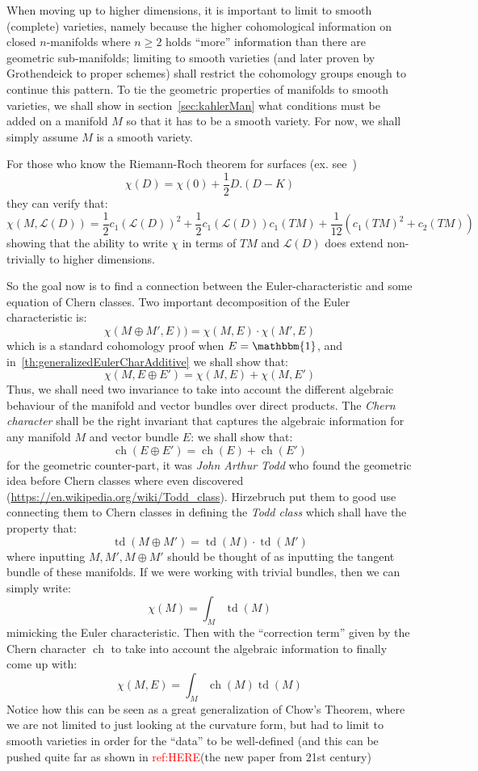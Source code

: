 \documentclass{book}
\newcommand{\CL}{{\mathcal{L}}}
\newcommand{\ch}{{\operatorname{ch}}}
\newcommand{\td}{{\operatorname{td}}}
\begin{document}
When moving up to higher dimensions, it is important to limit to smooth (complete) varieties, namely because the higher
cohomological information on closed $n$-manifolds where $n\ge 2$ holds ``more'' information than there are
geometric sub-manifolds; limiting to smooth varieties (and later proven by Grothendeick to proper
schemes) shall restrict the cohomology groups enough to continue this pattern. To tie the geometric properties
of manifolds to smooth varieties, we shall show in section~\ref{sec:kahlerMan} what conditions must be added
on a manifold $M$ so that it has to be a smooth variety. For now, we shall simply assume $M$ is a smooth
variety.

For those who know the Riemann-Roch theorem for surfaces (ex. see~\cite[chapter~5.1,
theorem~1.6]{hartshorneAlgebraicGeometry2013})
\[
\chi(D) = \chi(0) + \frac{1}{2}D.(D-K)
\]
they can verify that:
\[
  \chi(M, \CL(D)) =\frac{1}{2}c_1(\CL(D))^2 + \frac{1}{2}c_1(\CL(D))c_1(TM) + \frac{1}{12}(c_1(TM)^2 + c_2(TM))
\]
showing that the ability to write $\chi$ in terms of $TM$ and $\CL(D)$ does extend non-trivially to higher
dimensions.


So the goal now is to find a connection between the Euler-characteristic and some equation of Chern classes.
Two important decomposition of the Euler characteristic is:
\[
  \chi(M\oplus M', E)) = \chi(M, E)\cdot \chi(M', E)
\]
which is a standard cohomology proof when $E = \mathbbm{1}$, and in~\cref{th:generalizedEulerCharAdditive} we shall show that:
\[
  \chi(M, E\oplus E') = \chi(M, E) + \chi(M, E')
\]
Thus, we shall need two invariance to take into account the different algebraic behaviour of the manifold and
vector bundles over direct products. The \emph{Chern character} shall be the right invariant that captures the
algebraic information for any manifold $M$ and vector bundle $E$: we shall show that:
\[
  \ch(E\oplus E') = \ch(E) + \ch(E')
\]
for the geometric counter-part, it was \emph{John Arthur Todd} who found
the geometric idea before Chern classes where even discovered
(\url{https://en.wikipedia.org/wiki/Todd_class}). Hirzebruch put them to good use connecting
them to Chern classes in defining the \emph{Todd class} which shall have the property that:
\[
  \td(M\oplus M') = \td(M)\cdot \td(M')
\]
where inputting $M, M', M\oplus M'$ should be thought of as inputting the tangent bundle of these manifolds.
If we were working with trivial bundles, then we can simply write:
\[
  \chi(M) = \int_M \td(M)
\]
mimicking the Euler characteristic. Then with
the ``correction term'' given by the Chern character $\ch$ to take into account the algebraic information to
finally come up with:
\[
  \chi(M,E) = \int_M \ch(M)\td(M)
\]
Notice how this can be seen as a great generalization of Chow's Theorem, where we are not limited to just
looking at the curvature form, but had to limit to smooth varieties in order for the ``data'' to be
well-defined (and this can be pushed quite far as shown in \textcolor{red}{ref:HERE}(the new paper from 21st
century)
\end{document}
